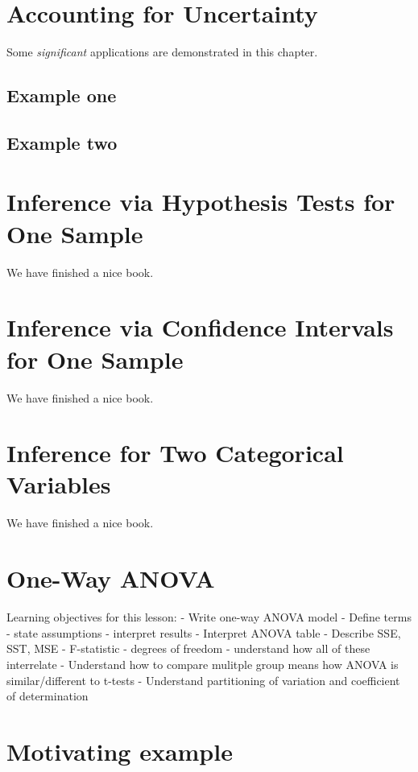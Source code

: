 \documentclass[]{book}
\theoremstyle{definition}
\theoremstyle{definition}
\theoremstyle{definition}
\theoremstyle{remark}
\begin{document}
\chapter{Accounting for Uncertainty}\label{accounting-for-uncertainty}

Some \emph{significant} applications are demonstrated in this chapter.

\section{Example one}\label{example-one}

\section{Example two}\label{example-two}

\chapter{Inference via Hypothesis Tests for One Sample}\label{HT}

We have finished a nice book.

\chapter{Inference via Confidence Intervals for One Sample}\label{CI}

We have finished a nice book.

\chapter{Inference for Two Categorical Variables}\label{twocategorical}

We have finished a nice book.

\chapter{One-Way ANOVA}\label{anova}

Learning objectives for this lesson: - Write one-way ANOVA model -
Define terms - state assumptions - interpret results - Interpret ANOVA
table - Describe SSE, SST, MSE - F-statistic - degrees of freedom -
understand how all of these interrelate - Understand how to compare
mulitple group means how ANOVA is similar/different to t-tests -
Understand partitioning of variation and coefficient of determination

\chapter{Motivating example}\label{motivating-example}
\end{document}

